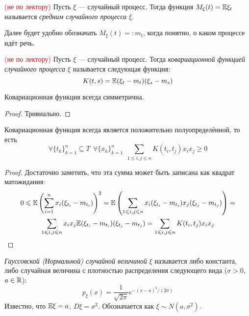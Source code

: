 \begin{definition} \textcolor{red}{(не по лектору)}
	Пусть $\xi$ --- случайный процесс. Тогда функция $M_\xi(t) = \mathbb{E} \xi_t$ называется \textit{средним случайного процесса $\xi$}.
\end{definition}

\begin{anote}
	Далее будет удобно обозначать $M_\xi(t) =: m_t$, когда понятно, о каком процессе идёт речь.
\end{anote}

\begin{definition} \textcolor{red}{(не по лектору)}
	Пусть $\xi$ --- случайный процесс. Тогда \textit{ковариационной функцией случайного процесса $\xi$} называется следующая функция:
	\[
		K(t, s) = \mathbb{E}(\xi_t - m_t)(\xi_s - m_s)
	\]
\end{definition}

\begin{proposition}
	Ковариационная функция всегда симметрична.
\end{proposition}

\begin{proof}
	Тривиально.
\end{proof}

\begin{proposition}
	Ковариационная функция всегда является положительно полуопределённой, то есть
	\[
		\forall \{t_k\}_{k = 1}^n \subseteq T\ \ \forall \{x_k\}_{k = 1}^n\ \ \sum_{1 \le i, j \le n} K(t_i, t_j)x_ix_j \ge 0
	\]
\end{proposition}

\begin{proof}
	Достаточно заметить, что эта сумма может быть записана как квадрат матожидания:
	\begin{multline*}
		0 \leqslant \mathbb{E}\left(\sum_{i = 1}^n x_i(\xi_{t_i} - m_{t_i})\right)^2 = \mathbb{E}\left(\sum_{1 \leqslant i, j \leqslant n} x_i(\xi_{t_i} - m_{t_i})x_j(\xi_{t_j} - m_{t_j})\right) =
		\\
		\sum_{1 \leqslant i, j \leqslant n} x_ix_j\mathbb{E} (\xi_{t_i} - m_{t_i})(\xi_{t_j} - m_{t_j}) = \sum_{1 \leqslant i, j \leqslant n} K(t_i, t_j)x_ix_j
	\end{multline*}
	
\end{proof}

\begin{reminder}
	\textit{Гауссовской (Нормальной) случайной величиной} $\xi$ называется либо константа, либо случайная величина с плотностью распределения следующего вида ($\sigma > 0$, $a \in \mathbb{R}$):
	\[
		p_\xi(x) = \frac{1}{\sqrt{2\pi}}e^{-(x - a)^2 / (2\sigma)}
	\]
	Известно, что $\mathbb{E} \xi = a$, $D\xi = \sigma^2$. Обозначается как $\xi \sim N(a, \sigma^2)$.
\end{reminder}

